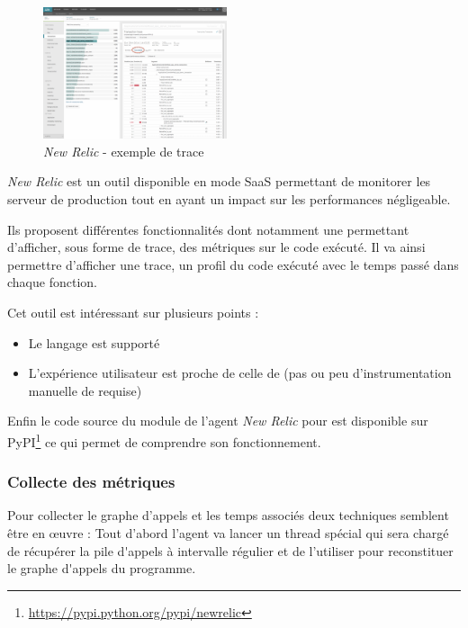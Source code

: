 \begin{figure}
  \vspace{-30pt}
  \begin{center}
    \includegraphics[width=0.48\textwidth]{images/new-relic_trace}
  \end{center}
  \vspace{-22pt}
  \caption{\emph{New Relic} - exemple de trace}
  \vspace{-20pt}
\end{figure}

\emph{New Relic} est un outil disponible en mode \gls{SaaS} permettant de monitorer les serveur de \gls{production} tout en ayant un impact sur les performances négligeable.

Ils proposent différentes fonctionnalités dont notamment une permettant d'afficher, sous forme de trace, des métriques sur le code exécuté. Il va ainsi permettre d'afficher une trace, un profil du code exécuté avec le temps passé dans chaque fonction.
 
\clearpage
Cet outil est intéressant sur plusieurs points :
\begin{itemize}
  \item Le langage \Python est supporté
  \item L'expérience utilisateur est proche de celle de \Blackfire (pas ou peu d'instrumentation manuelle de requise)
\end{itemize}
  
Enfin le code source du module de l'agent \emph{New Relic} pour \Python est disponible sur \gls{PyPI}\footnote{\url{https://pypi.python.org/pypi/newrelic}} ce qui permet de comprendre son fonctionnement.
  
  \subsubsection{Collecte des métriques}
Pour collecter le graphe d'appels et les temps associés deux techniques semblent être en œuvre :
Tout d'abord l'agent va lancer un thread spécial qui sera chargé de récupérer la \gls{pile d'appels} à intervalle régulier et de l'utiliser pour reconstituer le \gls{graphe d'appels} du programme.
 
